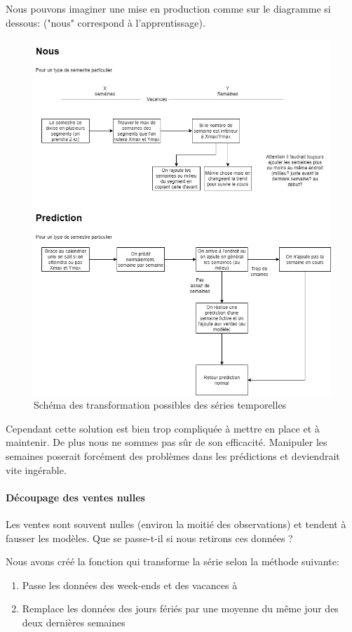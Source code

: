 Nous pouvons imaginer une mise en production comme sur le diagramme si dessous: ("nous" correspond à l'apprentissage).
\begin{figure}[H]
	\centering
	\includegraphics[width=1\textwidth]{figures/production.png}
	\caption{Schéma des transformation possibles des séries temporelles}
    \label{fig:scheme_remapping}
\end{figure}

Cependant cette solution est bien trop compliquée à mettre en place et à maintenir.
De plus nous ne sommes pas sûr de son efficacité. Manipuler les semaines poserait forcément des problèmes dans les prédictions et deviendrait vite ingérable.

\paragraph{Découpage des ventes nulles}

Les ventes sont souvent nulles (environ la moitié des observations) et tendent à fausser les modèles. Que se passe-t-il si nous retirons ces données ?

Nous avons créé la fonction  qui transforme la série selon la méthode suivante:
\begin{enumerate}[nolistsep]
    \item Passe les données des week-ends et des vacances à 
    \item Remplace les données des jours fériés par une moyenne du même jour des deux dernières semaines
\end{enumerate}


